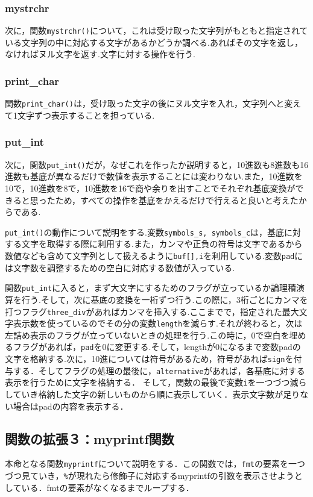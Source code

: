 \documentclass[a4j,11pt]{jarticle}
\begin{document}
\subsubsection{mystrchr}
次に，関数\verb|mystrchr()|について，これは受け取った文字列がもともと指定されている文字列の中に対応する文字があるかどうか調べる.あればその文字を返し，なければヌル文字を返す.文字に対する操作を行う.
\subsubsection{print\_char}
関数\verb|print_char()|は，受け取った文字の後にヌル文字を入れ，文字列へと変えて1文字ずつ表示することを担っている.
\subsubsection{put\_int}
次に，関数\verb|put_int()|だが，なぜこれを作ったか説明すると，10進数も8進数も16進数も基底が異なるだけで数値を表示することには変わりない.また，10進数を10で，10進数を8で，10進数を16で商や余りを出すことでそれぞれ基底変換ができると思ったため，すべての操作を基底をかえるだけで行えると良いと考えたからである.

\verb|put_int()|の動作について説明をする.変数\verb|symbols_s, symbols_c|は，基底に対する文字を取得する際に利用する.また，カンマや正負の符号は文字であるから数値なども含めて文字列として扱えるように\verb|buf[],i|を利用している.変数\verb|pad|には文字数を調整するための空白に対応する数値が入っている.

関数\verb|put_int|に入ると，まず大文字にするためのフラグが立っているか論理積演算を行う.そして，次に基底の変換を一桁ずつ行う.この際に，3桁ごとにカンマを打つフラグ\verb|three_div|があればカンマを挿入する.ここまでで，指定された最大文字表示数を使っているのでその分の変数\verb|length|を減らす.それが終わると，次は左詰め表示のフラグが立っていないときの処理を行う.この時に，0で空白を埋めるフラグがあれば，\verb|pad|を$0$に変更する.そして，lengthが0になるまで変数padの文字を格納する.次に，10進については符号があるため，符号があれば\verb|sign|を付与する．そしてフラグの処理の最後に，\verb|alternative|があれば，各基底に対する表示を行うために文字を格納する．
そして，関数の最後で変数\verb|i|を一つづつ減らしていき格納した文字の新しいものから順に表示していく．表示文字数が足りない場合はpadの内容を表示する．

\subsection{関数の拡張３：myprintf関数}
本命となる関数\verb|myprintf|について説明をする．この関数では，\verb|fmt|の要素を一つづつ見ていき，\verb|%|が現れたら修飾子に対応するmyprintfの引数を表示させようとしている．fmtの要素がなくなるまでループする．
\end{document}
